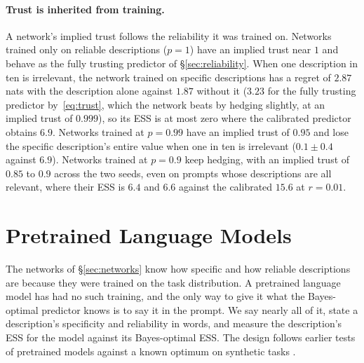 \documentclass{article}
\begin{document}
\paragraph{Trust is inherited from training.} A network's implied trust follows the reliability it was trained on. Networks trained only on reliable descriptions ($p = 1$) have an implied trust near $1$ and behave as the fully trusting predictor of \S\ref{sec:reliability}. When one description in ten is irrelevant, the network trained on specific descriptions has a regret of $2.87$ nats with the description alone against $1.87$ without it ($3.23$ for the fully trusting predictor by~\eqref{eq:trust}, which the network beats by hedging slightly, at an implied trust of $0.999$), so its ESS is at most zero where the calibrated predictor obtains $6.9$. Networks trained at $p = 0.99$ have an implied trust of $0.95$ and lose the specific description's entire value when one in ten is irrelevant ($0.1 \pm 0.4$ against $6.9$). Networks trained at $p = 0.9$ keep hedging, with an implied trust of $0.85$ to $0.9$ across the two seeds, even on prompts whose descriptions are all relevant, where their ESS is $6.4$ and $6.6$ against the calibrated $15.6$ at $r = 0.01$.

\section{Pretrained Language Models}\label{sec:llm}
The networks of \S\ref{sec:networks} know how specific and how reliable descriptions are because they were trained on the task distribution. A pretrained language model has had no such training, and the only way to give it what the Bayes-optimal predictor knows is to say it in the prompt. We say nearly all of it, state a description's specificity and reliability in words, and measure the description's ESS for the model against its Bayes-optimal ESS. The design follows earlier tests of pretrained models against a known optimum on synthetic tasks \citep{gupta2025, akata2026}.
\end{document}
